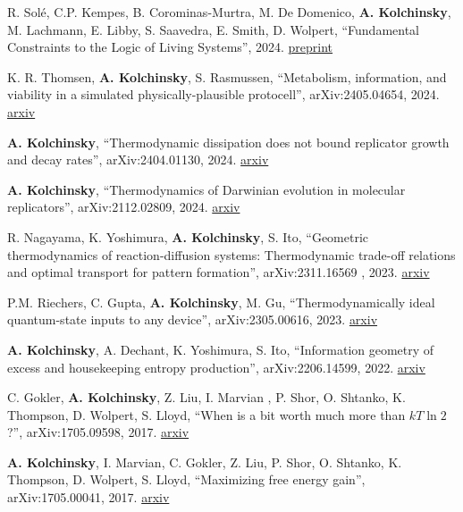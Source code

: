 
R. Solé, C.P. Kempes, B. Corominas-Murtra, M. De Domenico, \textbf{A. Kolchinsky}, M. Lachmann, E. Libby, S. Saavedra, E. Smith, D. Wolpert, ``Fundamental Constraints to the Logic of Living Systems'', 2024. \href{https://www.preprints.org/manuscript/202406.0891/v1}{preprint}

K. R. Thomsen, \textbf{A. Kolchinsky}, S. Rasmussen, ``Metabolism, information, and viability in a simulated physically-plausible protocell'', arXiv:2405.04654, 2024. \href{http://arxiv.org/abs/2405.04654}{arxiv}

\textbf{A. Kolchinsky}, ``Thermodynamic dissipation does not bound replicator growth and decay rates'', arXiv:2404.01130, 2024. \href{http://arxiv.org/abs/2404.01130}{arxiv} 

\textbf{A. Kolchinsky}, ``Thermodynamics of Darwinian evolution in molecular replicators'', arXiv:2112.02809, 2024. \href{http://arxiv.org/abs/2112.02809}{arxiv} 

R. Nagayama, K. Yoshimura, \textbf{A. Kolchinsky}, S. Ito, ``Geometric thermodynamics of reaction-diffusion systems: Thermodynamic trade-off relations and optimal transport for pattern formation'', arXiv:2311.16569 , 2023. \href{https://arxiv.org/abs/2311.16569}{arxiv}
 
P.M. Riechers, C. Gupta, \textbf{A. Kolchinsky}, M. Gu, ``Thermodynamically ideal quantum-state inputs to any device'', arXiv:2305.00616, 2023. \href{http://arxiv.org/abs/2305.00616}{arxiv}

\textbf{A. Kolchinsky}, A. Dechant, K. Yoshimura, S. Ito, 
``Information geometry of excess and housekeeping entropy production'', arXiv:2206.14599, 2022. \href{https://arxiv.org/abs/2206.14599}{arxiv}

C. Gokler, \textbf{A. Kolchinsky}, Z. Liu, I. Marvian , P. Shor, O. Shtanko, K. Thompson, D. Wolpert, S. Lloyd, ``When is a bit worth much more than $kT \ln 2$?'', arXiv:1705.09598, 2017. \href{https://arxiv.org/abs/1705.09598}{arxiv}

\textbf{A. Kolchinsky}, I. Marvian, C. Gokler, Z. Liu, P. Shor, O. Shtanko, K. Thompson, D. Wolpert, S. Lloyd, ``Maximizing free energy gain'', arXiv:1705.00041, 2017. \href{https://arxiv.org/abs/1705.00041}{arxiv}

